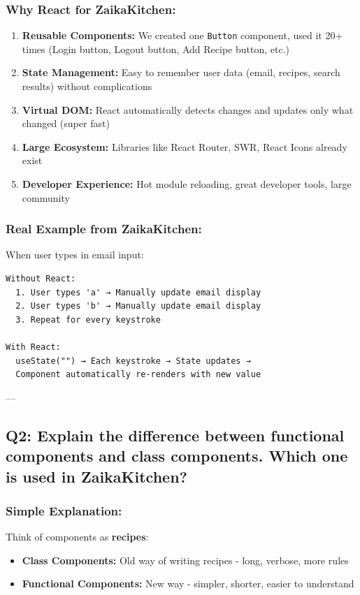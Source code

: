 \documentclass[12pt]{article}
\begin{document}
\subsubsection*{Why React for ZaikaKitchen:}

\begin{enumerate}
    \item \textbf{Reusable Components:} We created one \texttt{Button} component, used it 20+ times (Login button, Logout button, Add Recipe button, etc.)
    \item \textbf{State Management:} Easy to remember user data (email, recipes, search results) without complications
    \item \textbf{Virtual DOM:} React automatically detects changes and updates only what changed (super fast)
    \item \textbf{Large Ecosystem:} Libraries like React Router, SWR, React Icons already exist
    \item \textbf{Developer Experience:} Hot module reloading, great developer tools, large community
\end{enumerate}

\subsubsection*{Real Example from ZaikaKitchen:}

When user types in email input:
\begin{lstlisting}
Without React: 
  1. User types 'a' → Manually update email display
  2. User types 'b' → Manually update email display
  3. Repeat for every keystroke

With React:
  useState("") → Each keystroke → State updates → 
  Component automatically re-renders with new value
\end{lstlisting}

---

\subsection{Q2: Explain the difference between functional components and class components. Which one is used in ZaikaKitchen?}

\subsubsection*{Simple Explanation:}

Think of components as \textbf{recipes}:
\begin{itemize}
    \item \textbf{Class Components:} Old way of writing recipes - long, verbose, more rules
    \item \textbf{Functional Components:} New way - simpler, shorter, easier to understand
\end{itemize}
\end{document}
